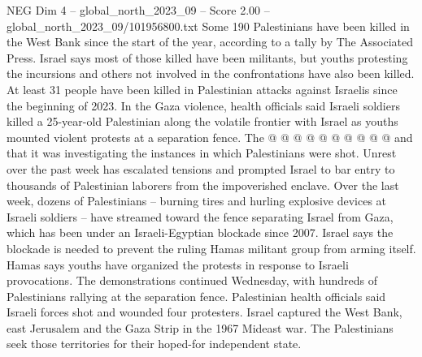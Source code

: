 \begin{textsample}{NEG Dim 4 – global\_north\_2023\_09 – Score 2.00 – global\_north\_2023\_09/101956800.txt}
Some 190 Palestinians have been killed in the West Bank since the start of the year, according to a tally by The Associated Press.
Israel says most of those killed have been militants, but youths protesting the incursions and others not involved in the confrontations have also been killed.
At least 31 people have been killed in Palestinian attacks against Israelis since the beginning of 2023.
In the Gaza violence, health officials said Israeli soldiers killed a 25-year-old Palestinian along the volatile frontier with Israel as youths mounted violent protests at a separation fence.
The @ @ @ @ @ @ @ @ @ @ and that it was investigating the instances in which Palestinians were shot.
Unrest over the past week has escalated tensions and prompted Israel to bar entry to thousands of Palestinian laborers from the impoverished enclave.
Over the last week, dozens of Palestinians -- burning tires and hurling explosive devices at Israeli soldiers -- have streamed toward the fence separating Israel from Gaza, which has been under an Israeli-Egyptian blockade since 2007.
Israel says the blockade is needed to prevent the ruling Hamas militant group from arming itself.
Hamas says youths have organized the protests in response to Israeli provocations.
The demonstrations continued Wednesday, with hundreds of Palestinians rallying at the separation fence.
Palestinian health officials said Israeli forces shot and wounded four protesters.
Israel captured the West Bank, east Jerusalem and the Gaza Strip in the 1967 Mideast war.
The Palestinians seek those territories for their hoped-for independent state.

\end{textsample}
